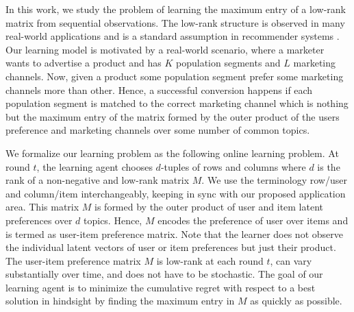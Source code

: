 In this work, we study the problem of learning the maximum entry of a low-rank matrix from sequential observations. The low-rank structure is observed in many real-world applications and is a standard assumption in recommender systems \citep{koren2009matrix,ricci2011liorrokach}. Our learning model is motivated by a real-world scenario, where a marketer wants to advertise a product and has $K$ population segments and $L$ marketing channels. Now, given a product some population segment prefer some marketing channels more than other.  Hence, a successful conversion happens if each population segment is matched to the correct marketing channel which is nothing but the maximum entry of the matrix formed by the outer product of the users preference and marketing channels over some number of common topics.  

We formalize our learning problem as the following online learning problem. At round $t$, the learning agent chooses $d$-tuples of rows and columns where $d$ is the rank of a non-negative and low-rank matrix $M$. We use the terminology row/user and column/item interchangeably, keeping in sync with our proposed application area. This matrix $M$ is formed by the outer product of user and item latent preferences over $d$ topics. Hence, $M$ encodes the preference of user over items and is termed as user-item preference matrix. Note that the learner does not observe the individual latent vectors of user or item preferences but just their product. The user-item preference matrix $M$ is low-rank at each round $t$, can vary substantially over time, and does not have to be stochastic. The goal of our learning agent is to minimize the cumulative regret with respect to a best solution in hindsight by finding the maximum entry in $M$ as quickly as possible.





